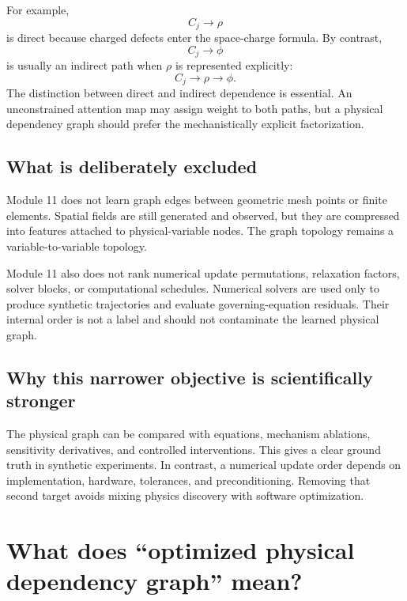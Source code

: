 \documentclass[11pt]{article}
\begin{document}
For example,
\begin{equation}
C_j\rightarrow \rho
\end{equation}
is direct because charged defects enter the space-charge formula. By contrast,
\begin{equation}
C_j\rightarrow\phi
\end{equation}
is usually an indirect path when \(\rho\) is represented explicitly:
\begin{equation}
C_j\rightarrow\rho\rightarrow\phi.
\end{equation}
The distinction between direct and indirect dependence is essential. An unconstrained attention map may assign weight to both paths, but a physical dependency graph should prefer the mechanistically explicit factorization.

\subsection{What is deliberately excluded}

Module 11 does not learn graph edges between geometric mesh points or finite elements. Spatial fields are still generated and observed, but they are compressed into features attached to physical-variable nodes. The graph topology remains a variable-to-variable topology.

Module 11 also does not rank numerical update permutations, relaxation factors, solver blocks, or computational schedules. Numerical solvers are used only to produce synthetic trajectories and evaluate governing-equation residuals. Their internal order is not a label and should not contaminate the learned physical graph.

\subsection{Why this narrower objective is scientifically stronger}

The physical graph can be compared with equations, mechanism ablations, sensitivity derivatives, and controlled interventions. This gives a clear ground truth in synthetic experiments. In contrast, a numerical update order depends on implementation, hardware, tolerances, and preconditioning. Removing that second target avoids mixing physics discovery with software optimization.

\section{What does ``optimized physical dependency graph'' mean?}
\end{document}
